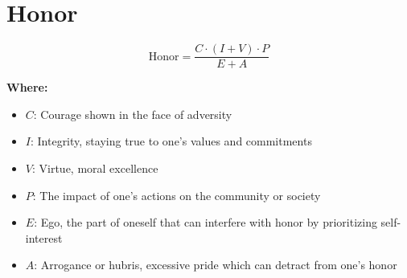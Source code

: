 \chapter{Honor}

\begin{equation}
\text{Honor} = \frac{C \cdot (I + V) \cdot P}{E + A}
\end{equation}

\textbf{Where:}

\begin{itemize}
    \item $C$: Courage shown in the face of adversity
    \item $I$: Integrity, staying true to one's values and commitments
    \item $V$: Virtue, moral excellence
    \item $P$: The impact of one's actions on the community or society
    \item $E$: Ego, the part of oneself that can interfere with honor by prioritizing self-interest
    \item $A$: Arrogance or hubris, excessive pride which can detract from one's honor
\end{itemize}